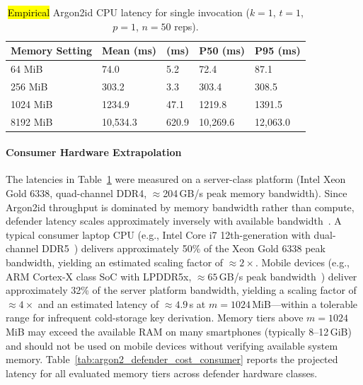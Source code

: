 \documentclass[mathematics,article,accept,pdftex,moreauthors]{Definitions/mdpi}
\begin{document}
\begin{table}[H]
\caption{\hl{Empirical} Argon2id CPU latency for single invocation ($k=1$, $t=1$, $p=1$, $n=50$ reps).}%
\label{tab:argon2_defender_cost}
\begin{tabularx}{\linewidth}{lm{2.1cm}<{\raggedleft}m{2.1cm}<{\raggedleft}m{2.4cm}<{\raggedleft}m{2.5cm}<{\raggedleft}}
\toprule
\textbf{Memory Setting} & \textbf{Mean (ms)} & \textbf{\boldmath{$\sigma$} (ms)} & \textbf{P50 (ms)} & \textbf{P95 (ms)} \\
\midrule
64 MiB   & 74.0        & 5.2         & 72.4        & 87.1        \\
256 MiB  & 303.2       & 3.3         & 303.4       & 308.5       \\
1024 MiB & 1234.9   & 47.1        & 1219.8   & 1391.5   \\
8192 MiB & 10{,}534.3  & 620.9       & 10{,}269.6  & 12{,}063.0  \\
\bottomrule

\end{tabularx}
\end{table}

\paragraph*{Consumer Hardware Extrapolation}
{The latencies in Table~\ref{tab:argon2_defender_cost} were measured on a server-class platform (Intel Xeon Gold 6338, quad-channel DDR4, $\approx$204\,GB/s peak memory bandwidth). Since Argon2id throughput is dominated by memory bandwidth rather than compute, defender latency scales approximately inversely with available bandwidth~\cite{7467361}. A typical consumer laptop CPU (e.g., Intel Core i7 12th-generation with dual-channel DDR5~\cite{JEDEC2020DDR5}) delivers approximately 50\% of the Xeon Gold 6338 peak bandwidth, yielding an estimated scaling factor of $\approx$$2\times$. Mobile devices (e.g., ARM Cortex-X class SoC with LPDDR5x, $\approx$$65$\,GB/s peak bandwidth~\cite{JEDEC2022LPDDR5x}) deliver approximately 32\% of the server platform bandwidth, yielding a scaling factor of $\approx$$4\times$ and an estimated latency of $\approx$$4.9$\,s at $m=1024$\,MiB---within a tolerable range for infrequent cold-storage key derivation. Memory tiers above $m=1024$\,MiB may exceed the available RAM on many smartphones (typically 8--12\,GiB) and should not be used on mobile devices without verifying available system memory. Table~\ref{tab:argon2_defender_cost_consumer} reports the projected latency for all evaluated memory tiers across defender hardware classes.}
\end{document}
